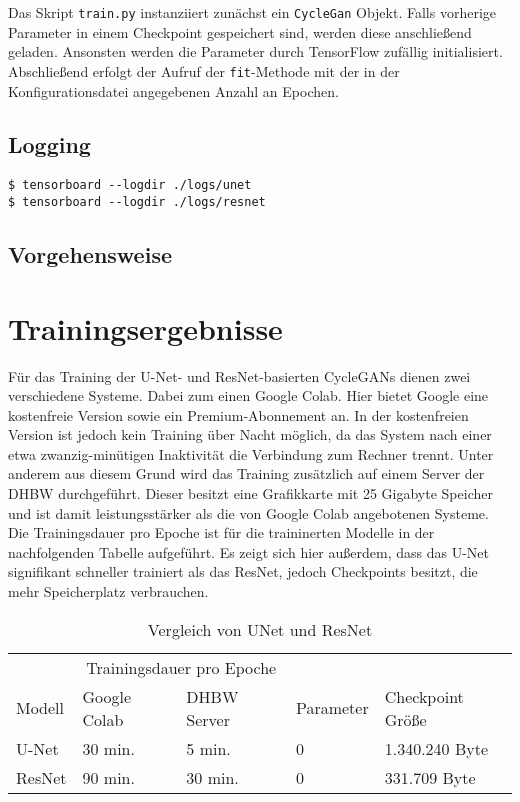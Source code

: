 Das Skript \texttt{train.py} instanziiert zunächst ein \texttt{CycleGan} Objekt. Falls vorherige Parameter in einem Checkpoint gespeichert sind, werden diese anschließend geladen. Ansonsten werden die Parameter durch TensorFlow zufällig initialisiert. Abschließend erfolgt der Aufruf der \texttt{fit}-Methode mit der in der Konfigurationsdatei angegebenen Anzahl an Epochen.

\subsection{Logging}

\begin{code}
   \begin{verbatim}
$ tensorboard --logdir ./logs/unet
$ tensorboard --logdir ./logs/resnet
   \end{verbatim}
\end{code}

\subsection{Vorgehensweise}

\section{Trainingsergebnisse}
\label{chap:trainingsergebnisse}
Für das Training der U-Net- und ResNet-basierten \acp{CycleGAN} dienen zwei verschiedene Systeme. Dabei zum einen Google Colab. Hier bietet Google eine kostenfreie Version sowie ein Premium-Abonnement an. In der kostenfreien Version ist jedoch kein Training über Nacht möglich, da das System nach einer etwa zwanzig-minütigen Inaktivität die Verbindung zum Rechner trennt. Unter anderem aus diesem Grund wird das Training zusätzlich auf einem Server der DHBW durchgeführt. Dieser besitzt eine Grafikkarte mit 25 Gigabyte Speicher und ist damit leistungsstärker als die von Google Colab angebotenen Systeme. Die Trainingsdauer pro Epoche ist für die traininerten Modelle in der nachfolgenden Tabelle aufgeführt. Es zeigt sich hier außerdem, dass das U-Net signifikant schneller trainiert als das ResNet, jedoch Checkpoints besitzt, die mehr Speicherplatz verbrauchen. 

\begin{table}[H]
   \centering
   \begin{tabular}{lllll}
   \toprule
   & \multicolumn{2}{c}{Trainingsdauer pro Epoche} & \\
   
   \cmidrule(r){2-3}
   
   Modell & Google Colab & DHBW Server & Parameter & Checkpoint Größe \\
   \midrule
   U-Net & 30 min. & 5 min. & 0 & 1.340.240 Byte \\
   ResNet & 90 min. & 30 min. & 0 & 331.709 Byte \\
   \bottomrule
    \end{tabular}
    \caption{Vergleich von UNet und ResNet}
\end{table}

